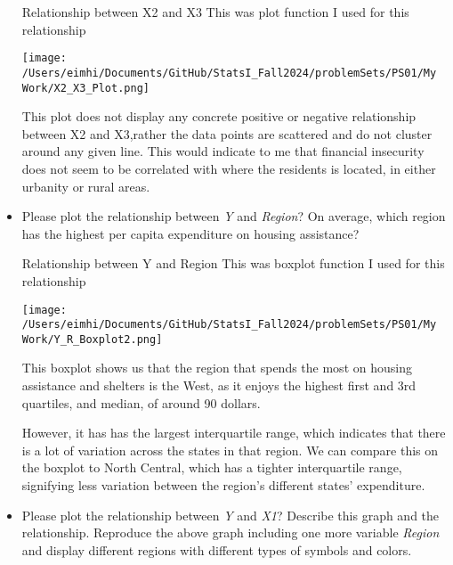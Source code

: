 \documentclass[12pt,letterpaper]{article}
\begin{document}
\begin{itemize}
    \newpage
    
    Relationship between X2 and X3
    This was plot function I used for this relationship
    
    
    \texttt{[image: /Users/eimhi/Documents/GitHub/StatsI\_Fall2024/problemSets/PS01/My Work/X2\_X3\_Plot.png]}
    
    This plot does not display any concrete positive or negative relationship between X2 and X3,rather the data points are scattered and do not cluster around any given line. This would indicate to me that financial insecurity does not seem to be correlated with where the residents is located, in either urbanity or rural areas.
    
    \newpage
    
    \item
    Please plot the relationship between \emph{Y} and \emph{Region}? On average, which region has the highest per capita expenditure on housing assistance?

    Relationship between Y and Region
    This was boxplot function I used for this relationship
    
    
    \texttt{[image: /Users/eimhi/Documents/GitHub/StatsI\_Fall2024/problemSets/PS01/My Work/Y\_R\_Boxplot2.png]}
    
    This boxplot shows us that the region that spends the most on housing assistance and shelters is the West, as it enjoys the highest first and 3rd quartiles, and median, of around 90 dollars. 
    
    However, it has has the largest interquartile range, which indicates that there is a lot of variation across the states in that region. We can compare this on the boxplot to North Central, which has a tighter interquartile range, signifying less variation between the region's different states' expenditure.
    
    \newpage

    \item
    Please plot the relationship between \emph{Y} and \emph{X1}? Describe this graph and the relationship. Reproduce the above graph including one more variable \emph{Region} and display different regions with different types of symbols and colors.
    

\end{itemize}
\end{document}
